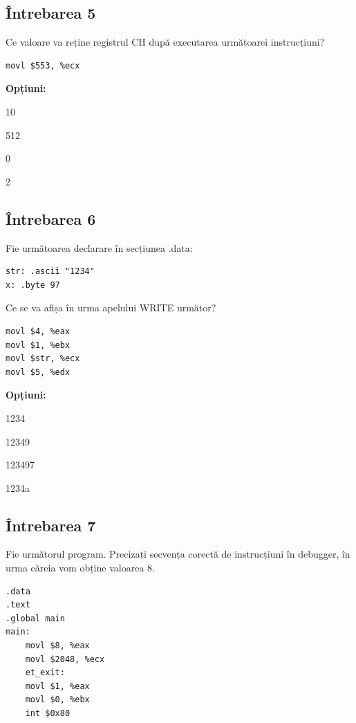 \documentclass[12pt,a4paper]{article}
\begin{document}
\subsection*{Întrebarea 5}
Ce valoare va reține registrul CH după executarea următoarei instrucțiuni?
\begin{lstlisting}[language=x86asm, caption={Cod Sursa (Lab 2.3)}]
movl $553, %ecx
\end{lstlisting}

\textbf{Opțiuni:}
\begin{itemize*}
    \item 10
    \item 512
    \item 0
    \item 2 
\end{itemize*}

\subsection*{Întrebarea 6}
Fie următoarea declarare în secțiunea .data:
\begin{lstlisting}[language=x86asm, caption={Declarații .data}]
str: .ascii "1234"
x: .byte 97
\end{lstlisting}
Ce se va afișa în urma apelului WRITE următor?
\begin{lstlisting}[language=x86asm, caption={Cod Sursa (Lab 2.3)}]
movl $4, %eax
movl $1, %ebx
movl $str, %ecx
movl $5, %edx
\end{lstlisting}

\textbf{Opțiuni:}
\begin{itemize*}
    \item 1234
    \item 12349
    \item 123497
    \item 1234a
\end{itemize*}

\subsection*{Întrebarea 7}
Fie următorul program. Precizați secvența corectă de instrucțiuni în debugger, în urma căreia vom obține valoarea 8.
\begin{lstlisting}[language=x86asm, caption={Cod Sursa (Lab 2.3)}]
.data
.text
.global main
main:
    movl $8, %eax
    movl $2048, %ecx
    et_exit:
    movl $1, %eax
    movl $0, %ebx
    int $0x80
\end{lstlisting}
\end{document}
